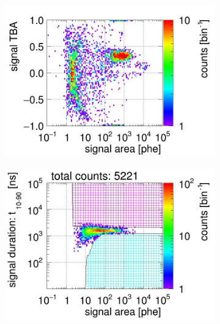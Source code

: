 \begin{landscape}
\begin{figure}[!p]
\begin{subfigure}[t]{0.32\textwidth}
			\includegraphics[width=\figurewidth,clip,trim={0 8 0 40}]{Figures/GasTest/CutsValid/res64769/tbapaX26Vecfig64769.jpg}
			\caption{}
			\label{fig:signal selection dv 14 03}
		\end{subfigure}
		\begin{subfigure}[t]{0.32\textwidth}
			\centering
			\includegraphics[width=\figurewidth,clip,trim={0 98 0 15}]{Figures/GasTest/CutsValid/res64769/pdpa29Vecfig64769.jpg}

\end{subfigure}
\end{figure}
\end{landscape}
